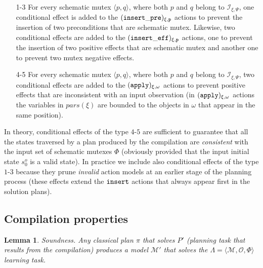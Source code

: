 \documentclass{article}
\newcommand{\tup}[1]{{\langle #1 \rangle}}
\newtheorem{mylemma}[mytheorem]{Lemma}
\begin{document}
\begin{enumerate}
	\item[1-3] For every schematic mutex $\tup{p,q}$, where both $p$ and $q$ belong to ${\mathcal I}_{\xi,\Psi}$, one conditional effect is added to the ${\tt \small (insert\_pre)_{\xi,p}}$ actions to prevent the insertion of two preconditions that are schematic mutex. Likewise, two conditional effects are added to the ${\tt \small (insert\_eff)_{\xi,p}}$ actions, one to prevent the insertion of two positive effects that are schematic mutex and another one to prevent two mutex negative effects.
	\item[4-5] For every schematic mutex $\tup{p,q}$, where both $p$ and $q$ belong to ${\mathcal I}_{\xi,\Psi}$, two conditional effects are added to the ${\tt \small (apply)_{\xi,\omega}}$ actions to prevent positive effects that are inconsistent with an input observation (in ${\tt \small (apply)_{\xi,\omega}}$ actions the variables in $pars(\xi)$ are bounded to the objects in $\omega$ that appear in the same position).
\end{enumerate}

In theory, conditional effects of the type $4$-$5$ are sufficient to guarantee that all the states traversed by a plan produced by the compilation are {\em consistent} with the input set of schematic mutexes $\Phi$ (obviously provided that the input initial state $s_0^o$ is a valid state). In practice we include also conditional effects of the type $1$-$3$ because they prune {\em invalid} action models at an earlier stage of the planning process (these effects extend the ${\tt \small insert}$ actions that always appear first in the solution plans).



\subsection{Compilation properties}
\begin{mylemma}
Soundness. Any classical plan $\pi$ that solves $P'$ (planning task that results from the compilation) produces a model $\mathcal{M'}$ that solves the $\Lambda=\tup{\mathcal{M},{\mathcal O},\Phi}$ learning task.
\end{mylemma}
\end{document}
